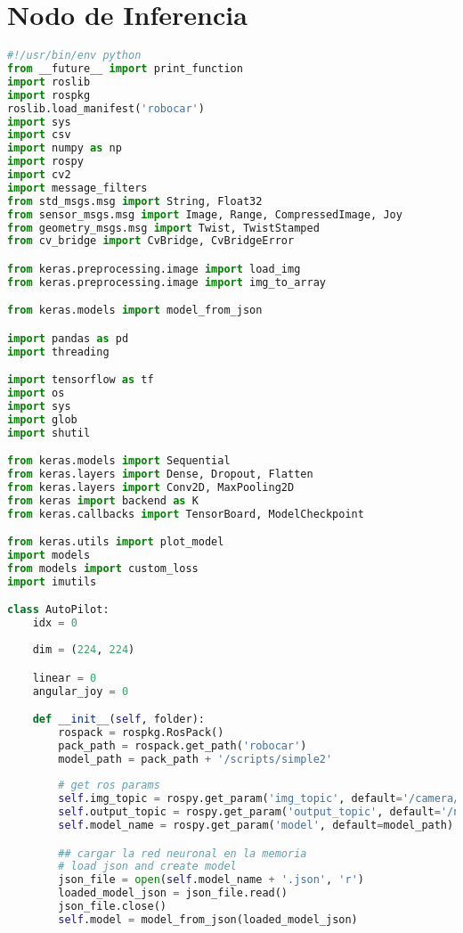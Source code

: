 \section{Nodo de Inferencia}

\begin{lstlisting}[title={neural\_node.py},language=Python]
#!/usr/bin/env python
from __future__ import print_function
import roslib
import rospkg
roslib.load_manifest('robocar')
import sys
import csv
import numpy as np
import rospy
import cv2
import message_filters
from std_msgs.msg import String, Float32
from sensor_msgs.msg import Image, Range, CompressedImage, Joy
from geometry_msgs.msg import Twist, TwistStamped
from cv_bridge import CvBridge, CvBridgeError

from keras.preprocessing.image import load_img
from keras.preprocessing.image import img_to_array

from keras.models import model_from_json

import pandas as pd
import threading

import tensorflow as tf
import os
import sys
import glob
import shutil

from keras.models import Sequential
from keras.layers import Dense, Dropout, Flatten
from keras.layers import Conv2D, MaxPooling2D
from keras import backend as K
from keras.callbacks import TensorBoard, ModelCheckpoint

from keras.utils import plot_model
import models
from models import custom_loss
import imutils

class AutoPilot:
    idx = 0
    
    dim = (224, 224)

    linear = 0
    angular_joy = 0

    def __init__(self, folder):
        rospack = rospkg.RosPack()
        pack_path = rospack.get_path('robocar')
        model_path = pack_path + '/scripts/simple2'
        
        # get ros params
        self.img_topic = rospy.get_param('img_topic', default='/camera/image/compressed')
        self.output_topic = rospy.get_param('output_topic', default='/neural_output')
        self.model_name = rospy.get_param('model', default=model_path)

        ## cargar la red neuronal en la memoria 
        # load json and create model
        json_file = open(self.model_name + '.json', 'r')
        loaded_model_json = json_file.read()
        json_file.close()
        self.model = model_from_json(loaded_model_json)


\end{lstlisting}

